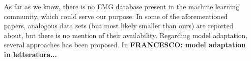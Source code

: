 As far as we know, there is no EMG database present in the machine
learning community, which could serve our purpose. In some of the
aforementioned papers, analogous data sets (but most likely smaller
than ours) are reported about, but there is no mention of their
availability.
Regarding model adaptation, several approaches has been proposed.
In 
\textbf{FRANCESCO: model adaptation in letteratura...}


